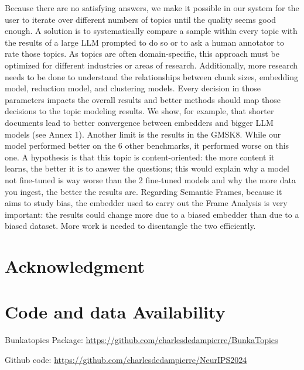 \documentclass{article}
\begin{document}
Because there are no satisfying answers, we make it possible in our system for the user to iterate over different numbers of topics until the quality seems good enough. A solution is to systematically compare a sample within every topic with the results of a large LLM prompted to do so or to ask a human annotator to rate those topics. As topics are often domain-specific, this approach must be optimized for different industries or areas of research. Additionally, more research needs to be done to understand the relationships between chunk sizes, embedding model, reduction model, and clustering models. Every decision in those parameters impacts the overall results and better methods should map those decisions to the topic modeling results. We show, for example, that shorter documents lead to better convergence between embedders and bigger LLM models (see Annex 1). Another limit is the results in the GMSK8. While our model performed better on the 6 other benchmarks, it performed worse on this one. A hypothesis is that this topic is content-oriented: the more content it learns, the better it is to answer the questions; this would explain why a model not fine-tuned is way worse than the 2 fine-tuned models and why the more data you ingest, the better the results are. Regarding Semantic Frames, because it aims to study bias, the embedder used to carry out the Frame Analysis is very important: the results could change more due to a biased embedder than due to a biased dataset. More work is needed to disentangle the two efficiently.

\section{Acknowledgment}
\section{Code and data Availability}

Bunkatopics Package: \url{https://github.com/charlesdedampierre/BunkaTopics}

Github code: \url{https://github.com/charlesdedampierre/NeurIPS2024}




\FloatBarrier %


\appendix
{}
\end{document}
